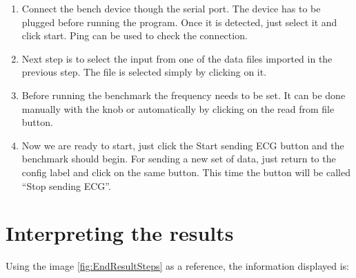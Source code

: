 \begin{enumerate}
    \item Connect the bench device though the serial port. The device has to be plugged before running the program. Once it is detected, just select it and click start. Ping can be used to check the connection.
    \item Next step is to select the input from one of the data files imported in the previous step. The file is selected simply by clicking on it.
    \item Before running the benchmark the frequency needs to be set. It can be done manually with the knob or automatically by clicking on the read from file button.
    \item Now we are ready to start, just click the Start sending ECG button and the benchmark should begin. For sending a new set of data, just return to the config label and click on the same button. This time the button will be called “Stop sending ECG”.
\end{enumerate}

\clearpage
\section{Interpreting the results}
Using the image \ref{fig:EndResultSteps} as a reference, the information displayed is:

